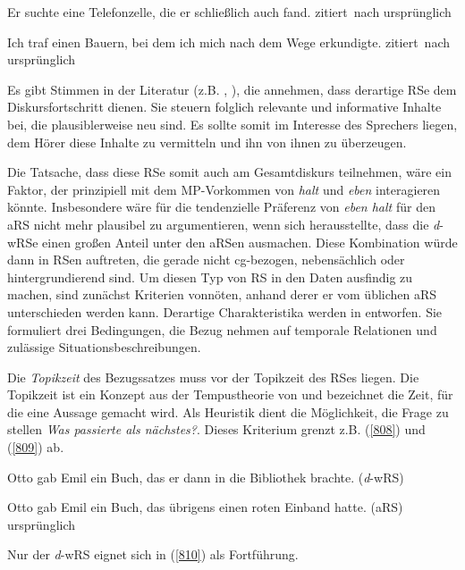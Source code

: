 \begin{exe}
	\ex\label{806} 
	Er suchte eine Telefonzelle, die er schließlich auch fand. 
	\newline
	\hbox{}\hfill\hbox{zitiert nach\citet[4]{Brandt1990}}	
	\newline
	\hbox{}\hfill\hbox{ursprünglich \citet[672]{Duden1984}}
\end{exe}

\begin{exe}
	\ex\label{807} 
	Ich traf einen Bauern, bei dem ich mich nach dem Wege erkundigte.
	\newline
	\hbox{}\hfill\hbox{zitiert nach\citet[5]{Brandt1990}}	
	\newline
	\hbox{}\hfill\hbox{ursprünglich \citet[28]{Jung1971}}
\end{exe}				
Es gibt Stimmen in der Literatur (z.B. \citealt[272-273]{Lehmann1984}, \citealt[67-68]{Brandt1990}), die annehmen, dass derartige RSe dem Diskursfortschritt dienen. Sie steuern folglich relevante und informative Inhalte bei, die plausiblerweise neu sind. Es sollte somit im Interesse des Sprechers liegen, dem Hörer diese Inhalte zu vermitteln und ihn von ihnen zu überzeugen.

Die Tatsache, dass diese RSe somit auch am Gesamtdiskurs teilnehmen, wäre ein Faktor, der prinzipiell mit dem MP-Vorkommen von \textit{halt} und \textit{eben} interagieren könnte. Insbesondere wäre für die tendenzielle Präferenz von \textit{eben halt} für den aRS nicht mehr plausibel zu argumentieren, wenn sich herausstellte, dass die \textit{d}-wRSe einen großen Anteil unter den aRSen ausmachen. Diese Kombination würde dann in RSen auftreten, die gerade nicht cg-bezogen, nebensächlich oder hintergrundierend sind. Um diesen Typ von RS in den Daten ausfindig zu machen, sind zunächst Kriterien vonnöten, anhand derer er vom üblichen aRS unterschieden werden kann. Derartige Charakteristika werden in \citet[158-163]{Holler2005} entworfen. Sie formuliert drei Bedingungen, die Bezug nehmen auf temporale Relationen und zulässige Situationsbeschreibungen.

Die \textit{Topikzeit}  des Bezugssatzes muss vor der Topikzeit des RSes liegen. Die Topikzeit ist ein Konzept aus der Tempustheorie von \citet{Klein1994} und bezeichnet die Zeit, für die eine Aussage gemacht wird. Als Heuristik dient die Möglichkeit, die Frage zu stellen \textit{Was passierte als nächstes?}. Dieses Kriterium grenzt z.B. (\ref{808}) und (\ref{809}) ab.

\begin{exe}
	\ex\label{808} 
	Otto gab Emil ein Buch, das er dann in die Bibliothek brachte. (\textit{d}-wRS)
\end{exe}
\vspace{-0.65cm}
\begin{exe}
	\ex\label{809} 
	Otto gab Emil ein Buch, das übrigens einen roten Einband hatte. (aRS)	
	\newline
	\hbox{}\hfill\hbox{ursprünglich\citet[158/159]{Holler2005}}
\end{exe}
Nur der \textit{d}-wRS eignet sich in (\ref{810}) als Fortführung.

